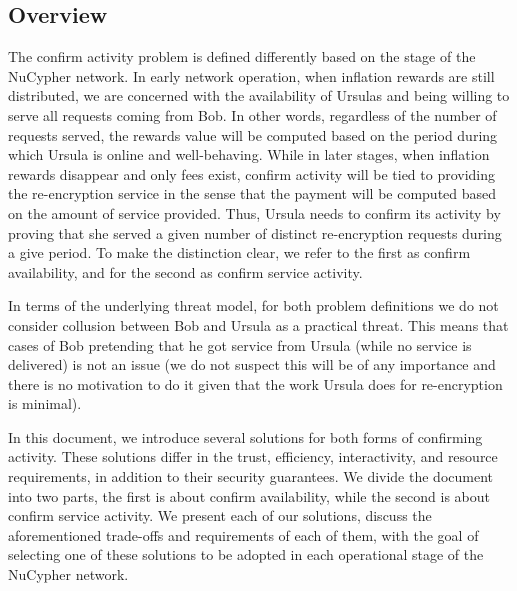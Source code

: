 \subsection{Overview}
The confirm activity problem is defined differently based on the stage of the 
NuCypher network. In early network operation, when inflation rewards are 
still distributed, we are concerned with the availability of Ursulas and being willing to 
serve all requests coming from Bob. In other words, regardless of the number of 
requests served, the rewards value will be computed based on the period during which Ursula 
is online and well-behaving. While in later stages, when inflation rewards disappear 
and only fees exist, confirm activity will be tied to providing the re-encryption 
service in the sense that the payment will be computed based on the amount of 
service provided. Thus, Ursula needs to confirm its activity by proving that she served 
a given number of distinct re-encryption requests during a give period. To make the distinction 
clear, we refer to the first as confirm availability, and for the second as confirm 
service activity.


In terms of the underlying threat model, for both problem definitions we do not consider collusion 
between Bob and Ursula as a practical threat. This means that cases of Bob pretending  
that he got service from Ursula (while no service is delivered) is not an issue (we do not 
suspect this will be of any importance and there is no motivation to do it given that 
the work Ursula does for re-encryption is minimal).


In this document, we introduce several solutions for both forms of confirming activity. 
These solutions differ in the trust, efficiency, interactivity, and resource 
requirements, in addition to their security guarantees. We divide the document into 
two parts, the first is about confirm availability, while the second is about confirm 
service activity. We present each of our solutions, discuss the aforementioned
trade-offs and requirements of each of them, with the goal of selecting one of these 
solutions to be adopted in each operational stage of the NuCypher network.




